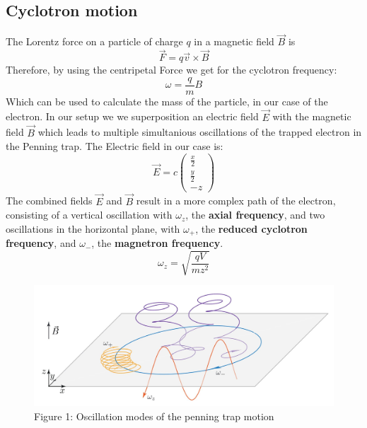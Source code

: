 \documentclass[12pt]{article}
\begin{document}
\subsection{Cyclotron motion}
The Lorentz force on a particle of charge $q$ in a magnetic field $\vec{B}$ is 
\begin{equation} \vec{F}=q \vec{v} \times \vec{B} \end{equation}
Therefore, by using the centripetal Force we get for the cyclotron frequency:
\begin{equation} \omega = \frac{q}{m}B \end{equation}
Which can be used to calculate the mass of the particle, in our case of the electron.
In our setup we we superposition an electric field $\vec{E}$ with the magnetic field $\vec{B}$ which leads to multiple simultanious oscillations of the trapped electron in the Penning trap. The Electric field in our case is:
\begin{equation} \vec{E} = c\begin{pmatrix} \frac{x}{2} \\ \frac{y}{2} \\ -z \end{pmatrix} \end{equation}
The combined fields $\vec{E}$ and $\vec{B}$ result in a more complex path of the electron, consisting of a vertical oscillation with $\omega_z$, the \textbf{axial frequency}, and two oscillations in the horizontal plane, with $\omega_+$, the \textbf{reduced cyclotron frequency}, and $\omega_-$, the \textbf{magnetron frequency}.
\begin{equation} \omega_z = \sqrt{\frac{qV}{mz^2}} \label{wzfreq} \end{equation}
\begin{figure}[h]
	\centering
	\includegraphics[width=16cm,bbllx=112,bburx=447,bblly=264,bbury=582]{cyclotronmotion.JPG}
	\caption{Figure 1: Oscillation modes of the penning trap motion}
	\label{ps}
\end{figure}
\end{document}
